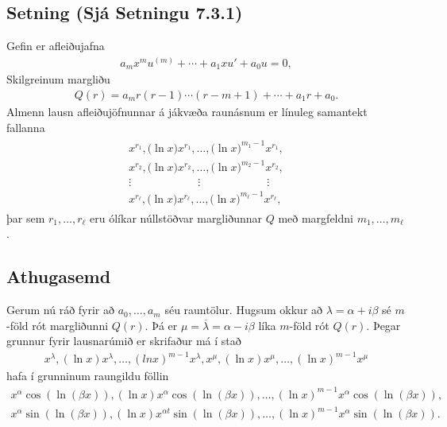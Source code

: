 \documentclass[a4paper,10pt,icelandic]{sphinxmanual}
\begin{document}
\subsection{Setning (Sjá Setningu 7.3.1)}
\label{\detokenize{Kafli07:setning-sja-setningu-7-3-1}}
Gefin er afleiðujafna
\begin{equation*}
\begin{split}a_mx^mu^{(m)}+\cdots+a_1xu'+a_0u=0,\end{split}
\end{equation*}
Skilgreinum margliðu
\begin{equation*}
\begin{split}Q(r)=a_m r(r-1)\cdots(r-m+1)+\cdots+a_1r+a_0.\end{split}
\end{equation*}
Almenn lausn afleiðujöfnunnar á jákvæða raunásnum er línuleg samantekt fallanna
\begin{equation*}
\begin{split}\begin{gathered}
x^{r_1}, \big(\ln x \big) x^{r_1}, \dots,
\big(\ln x\big)^{m_1-1}x^{r_1},\\
x^{r_2}, \big(\ln x\big)x^{r_2}, \dots,
\big(\ln x \big)^{m_2-1} x^{r_2},\\
\vdots \qquad \qquad \qquad \vdots \qquad \qquad \qquad \vdots\\
x^{r_\ell}, \big(\ln x \big)x^{r_\ell}, \dots,
\big(\ln x\big)^{m_\ell-1} x^{r_\ell},\end{gathered}\end{split}
\end{equation*}
þar sem \(r_1,\dots,r_\ell\) eru ólíkar núllstöðvar margliðunnar \(Q\) með margfeldni \(m_1,\dots,m_\ell\).


\subsection{Athugasemd}
\label{\detokenize{Kafli07:id4}}
Gerum nú ráð fyrir að \(a_0, \ldots, a_m\) séu rauntölur. Hugsum okkur að \(\lambda=\alpha+i\beta\) sé \(m\)-föld rót margliðunni \(Q(r)\). Þá er \(\mu=\overline{\lambda}=\alpha-i\beta\) líka \(m\)-föld rót \(Q(r)\). Þegar grunnur fyrir lausnarúmið er skrifaður má í stað
\begin{equation*}
\begin{split}x^{\lambda}, (\ln x)x^{\lambda},\dots, (ln x)^{m-1}x^{\lambda},
x^{\mu}, (\ln x)x^{\mu},\dots, (\ln x)^{m-1}x^{\mu}\end{split}
\end{equation*}
hafa í grunninum raungildu föllin
\begin{equation*}
\begin{split}x^{\alpha}\cos(\ln(\beta x)), (\ln x)x^{\alpha}\cos(\ln(\beta x)), \ldots,
(\ln x)^{m-1}x^{\alpha}\cos(\ln(\beta x)),\end{split}
\end{equation*}\begin{equation*}
\begin{split}x^{\alpha}\sin(\ln(\beta x)),
(\ln x)x^{\alpha t}\sin(\ln(\beta x)), \ldots, (\ln x)^{m-1}x^{\alpha}\sin(\ln(\beta x)).\end{split}
\end{equation*}
\end{document}
